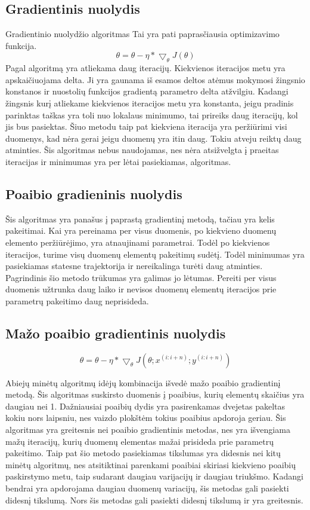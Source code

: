 \documentclass{VUMIFInfKursinis}
\begin{document}
\subsection{Gradientinis nuolydis}
Gradientinio nuolydžio algoritmas
Tai yra pati paprasčiausia optimizavimo funkcija.
\[
\theta = \theta - \eta * \bigtriangledown_{\theta}J(\theta)
\]
Pagal algoritmą yra atliekama daug iteracijų. Kiekvienos iteracijos metu yra
apskaičiuojama delta. Ji yra gaunama iš esamos deltos atėmus mokymosi žingsnio konstanos
ir nuostolių funkcijos gradientą parametro delta atžvilgiu. Kadangi žingsnis kurį
atliekame kiekvienos iteracijos metu yra konstanta, jeigu pradinis parinktas taškas
yra toli nuo lokalaus minimumo, tai prireiks daug iteracijų, kol jis bus pasiektas.
Šiuo metodu taip pat kiekviena iteracija yra peržiūrimi visi duomenys, kad nėra
gerai jeigu duomenų yra itin daug. Tokiu atveju reiktų daug atminties. Šis algoritmas nebus naudojamas, nes nėra
atsižvelgta į praeitas iteracijas ir minimumas yra per lėtai pasiekiamas, algoritmas.

\subsection{Poaibio gradieninis nuolydis}
 Šis algoritmas yra panašus į paprastą gradientinį metodą, tačiau yra kelis pakeitimai.
 Kai yra pereinama per visus duomenis, po kiekvieno duomenų elemento peržiūrėjimo,
 yra atnaujinami parametrai. Todėl po kiekvienos iteracijos, turime visų duomenų
 elementų pakeitimų sudėtį. Todėl minimumas yra pasiekiamas statesne trajektorija ir
 nereikalinga turėti daug atminties. Pagrindinis šio metodo trūkumas yra galimas jo
 lėtumas. Pereiti per visus duomenis užtrunka daug laiko ir nevisos duomenų elementų
 iteracijos prie parametrų pakeitimo daug neprisideda.

\subsection{Mažo poaibio gradientinis nuolydis}
\[
\theta = \theta - \eta * \bigtriangledown_{\theta}J(\theta;x^{(i:i+n)};y^{(i:i+n)})
\]
\par
Abiejų minėtų algoritmų idėjų kombinacija išvedė mažo poaibio gradientinį metodą.
Šis algoritmas suskirsto duomenis į poaibius, kurių elementų skaičius yra daugiau nei 1.
Dažniausiai poaibių dydis yra pasirenkamas dvejetas pakeltas kokiu nors laipsniu, nes
vaizdo plokštėm tokius poaibius apdoroja geriau. Šis algoritmas yra greitesnis nei poaibio
gradientinis metodas, nes yra išvengiama mažų iteracijų, kurių duomenų elementas mažai
prisideda prie parametrų pakeitimo. Taip pat šio metodo pasiekiamas tikslumas yra didesnis
nei kitų minėtų algoritmų, nes atsitiktinai parenkami poaibiai skiriasi kiekvieno
poaibių paskirstymo metu, taip sudarant daugiau varijacijų ir daugiau triukšmo. Kadangi
bendrai yra apdorojama daugiau duomenų variacijų, šis metodas gali pasiekti didesnį
tikslumą. Nors šis metodas gali pasiekti didesnį tikslumą ir yra greitesnis.
\end{document}
